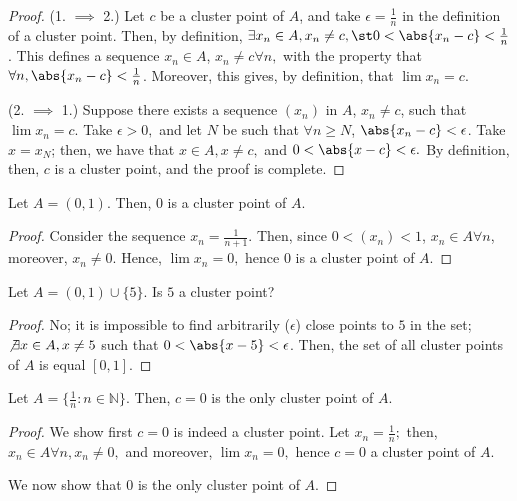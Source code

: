 \documentclass[12pt]{article}
\begin{document}
\begin{proof}
(1. $\implies$ 2.) Let $c$ be a cluster point of $A$, and take $\epsilon = \frac{1}{n}$ in the definition of a cluster point. Then, by definition, $\exists x_n \in A, x_n \neq c, \st 0 < \abs{x_n - c} < \frac{1}{n}$. This defines a sequence $x_n \in A$, $x_n \neq c \forall n,$ with the property that $\forall n, \abs{x_n - c} < \frac{1}{n}$. Moreover, this gives, by definition, that $\lim x_n = c$.

(2. $\implies$ 1.) Suppose there exists a sequence $(x_n)$ in $A$, $x_n \neq c$, such that $\lim x_n = c$. Take $\epsilon > 0,$ and let $N$ be such that $\forall n \geq N$, $\abs{x_n - c} < \epsilon$. Take $x = x_N$; then, we have that $x \in A, x\neq c,$ and $0 < \abs{x-c} < \epsilon.$ By definition, then, $c$ is a cluster point, and the proof is complete. 
\end{proof}

\begin{example}
  Let $A = (0,1)$. Then, $0$ is a cluster point of $A$.
  \begin{proof}
    Consider the sequence $x_n = \frac{1}{n+1}$. Then, since $0<(x_n)<1$, $x_n \in A \forall n$, moreover, $x_n \neq 0$. Hence, $\lim x_n = 0,$ hence $0$ is a cluster point of $A$.
  \end{proof}
\end{example}

\begin{example}
  Let $A = (0,1) \cup \{5\}$. Is $5$ a cluster point?
  \begin{proof}
    No; it is impossible to find arbitrarily ($\epsilon$) close points to $5$ in the set; $\not\exists x \in A, x \neq 5$ such that $0 < \abs{x - 5} < \epsilon$. Then, the set of all cluster points of $A$ is equal $[0,1]$.
  \end{proof}
\end{example}

\begin{example}
  Let $A = \{\frac{1}{n} : n \in \mathbb{N}\}$. Then, $c = 0$ is the only cluster point of $A$.
  \begin{proof}
    We show first $c = 0$ is indeed a cluster point. Let $x_n = \frac{1}{n};$ then, $x_n \in A \forall n, x_n \neq 0, $ and moreover, $\lim x_n = 0,$ hence $c = 0$ a cluster point of $A$.

    We now show that $0$ is the only cluster point of $A$. %
  \end{proof}
\end{example}
\end{document}
